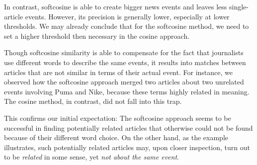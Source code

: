 \documentclass[a4paper,man,natbib,floatsintext,mask]{apa6}
\begin{document}
In contrast, softcosine is able to create bigger news events and leaves less single-article events. However, its precision is generally lower, especially at lower thresholds. 
We may already conclude that for the softcosine method, we need to set a higher threshold then necessary in the cosine approach.

Though softcosine similarity is able to compensate for the fact that journalists use different words to describe the same events, it results into matches between articles that are not similar in terms of their actual event. For instance, we observed how the softcosine approach merged two articles about two unrelated events involving Puma and Nike, because these terms highly related in meaning. The cosine method, in contrast, did not fall into this trap.


%
%

This confirms our initial expectation: 
The softcosine approach seems to be successful in finding potentially related articles that otherwise could not be found because of their different word choice.
On the other hand, as the example illustrates, such potentially related articles may, upon closer inspection, turn out to be \emph{related} in some sense, yet \emph{not about the same event}.
\end{document}

